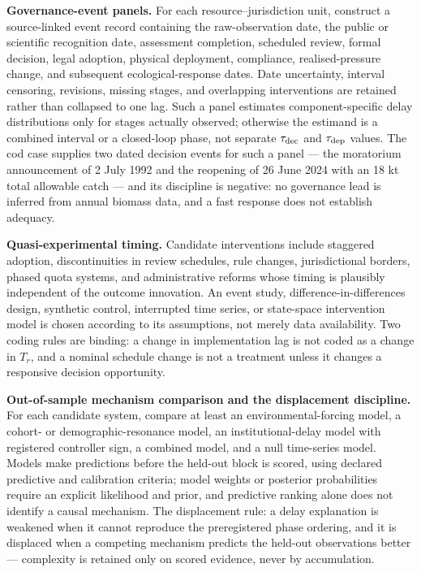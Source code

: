 \documentclass[11pt]{article}
\begin{document}
\textbf{Governance-event panels.} For each resource--jurisdiction unit,
construct a source-linked event record containing the raw-observation
date, the public or scientific recognition date, assessment completion,
scheduled review, formal decision, legal adoption, physical deployment,
compliance, realised-pressure change, and subsequent ecological-response
dates. Date uncertainty, interval censoring, revisions, missing stages,
and overlapping interventions are retained rather than collapsed to one
lag. Such a panel estimates component-specific delay distributions only
for stages actually observed; otherwise the estimand is a combined
interval or a closed-loop phase, not separate \(\tau_{\rm dec}\) and
\(\tau_{\rm dep}\) values. The cod case supplies two dated decision
events for such a panel --- the moratorium announcement of 2 July 1992
and the reopening of 26 June 2024 with an 18 kt total allowable catch
--- and its discipline is negative: no governance lead is inferred from
annual biomass data, and a fast response does not establish adequacy.

\textbf{Quasi-experimental timing.} Candidate interventions include
staggered adoption, discontinuities in review schedules, rule changes,
jurisdictional borders, phased quota systems, and administrative reforms
whose timing is plausibly independent of the outcome innovation. An
event study, difference-in-differences design, synthetic control,
interrupted time series, or state-space intervention model is chosen
according to its assumptions, not merely data availability. Two coding
rules are binding: a change in implementation lag is not coded as a
change in \(T_r\), and a nominal schedule change is not a treatment
unless it changes a responsive decision opportunity.

\textbf{Out-of-sample mechanism comparison and the displacement
discipline.} For each candidate system, compare at least an
environmental-forcing model, a cohort- or demographic-resonance model,
an institutional-delay model with registered controller sign, a combined
model, and a null time-series model. Models make predictions before the
held-out block is scored, using declared predictive and calibration
criteria; model weights or posterior probabilities require an explicit
likelihood and prior, and predictive ranking alone does not identify a
causal mechanism. The displacement rule: a delay explanation is weakened
when it cannot reproduce the preregistered phase ordering, and it is
displaced when a competing mechanism predicts the held-out observations
better --- complexity is retained only on scored evidence, never by
accumulation.
\end{document}
